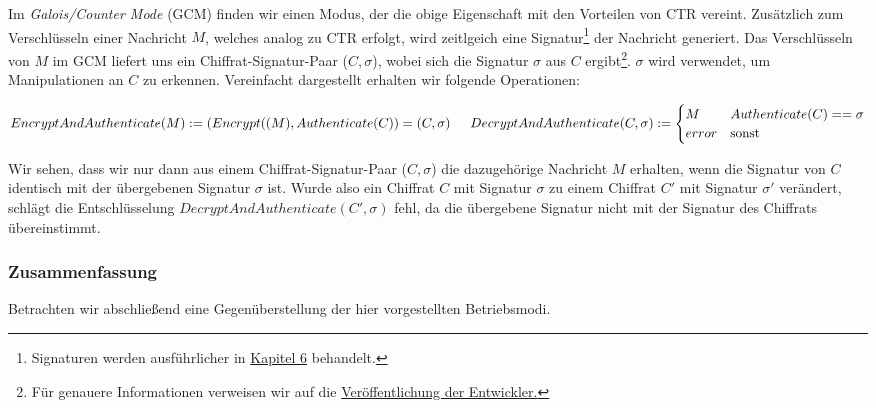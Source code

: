 Im \textit{Galois/Counter Mode} (GCM) finden wir einen Modus, der die obige Eigenschaft mit den Vorteilen von CTR vereint. Zusätzlich zum Verschlüsseln einer Nachricht \(M\), welches analog zu CTR erfolgt, wird zeitlgeich eine Signatur\footnote{Signaturen werden ausführlicher in \hyperref[cha6]{Kapitel 6} behandelt.} der Nachricht generiert. Das Verschlüsseln von \(M\) im GCM liefert uns ein Chiffrat-Signatur-Paar (\(C, \sigma\)), wobei sich die Signatur \(\sigma\) aus \(C\) ergibt\footnote{Für genauere Informationen verweisen wir auf die \href{http://csrc.nist.gov/groups/ST/toolkit/BCM/documents/proposedmodes/gcm/gcm-spec.pdf}{Veröffentlichung der Entwickler.}}. \(\sigma\) wird verwendet, um Manipulationen an \(C\) zu erkennen.
Vereinfacht dargestellt erhalten wir folgende Operationen:
\bigskip

\begin{math}
	EncryptAndAuthenticate(M) := (Encrypt((M), Authenticate(C)) = (C, \sigma) \\
	\\
	\indent DecryptAndAuthenticate(C, \sigma) := \begin{cases}
		M           & Authenticate(C) == \sigma\\
		error       & \text{sonst}
	\end{cases}
\end{math}
\bigskip

Wir sehen, dass wir nur dann aus einem Chiffrat-Signatur-Paar (\(C, \sigma\)) die dazugehörige Nachricht \(M\) erhalten, wenn die Signatur von \(C\) identisch mit der übergebenen Signatur \(\sigma\) ist. Wurde also ein Chiffrat \(C\) mit Signatur \(\sigma\) zu einem Chiffrat \(C'\) mit Signatur \(\sigma'\) verändert, schlägt die Entschlüsselung \(DecryptAndAuthenticate(C', \sigma)\) fehl, da die übergebene Signatur nicht mit der Signatur des Chiffrats übereinstimmt.

\subsubsection{Zusammenfassung}
Betrachten wir abschließend eine Gegenüberstellung der hier vorgestellten Betriebsmodi.
\newpage

\captionsetup[table]{labelformat=empty}
\captionsetup[table]{singlelinecheck=false}
\captionsetup{font=footnotesize}

